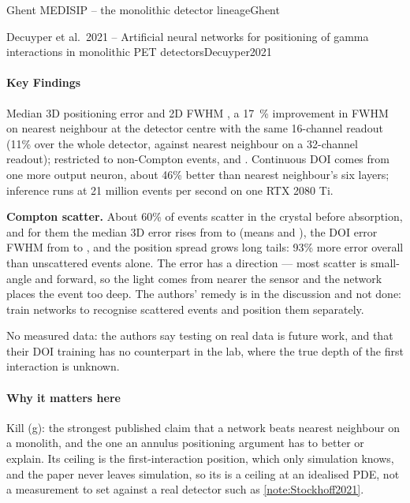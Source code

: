 \begin{programnote}{Ghent MEDISIP -- the monolithic detector lineage}{Ghent}
\begin{papernote}{Decuyper et al.\ 2021 -- Artificial neural networks for positioning of gamma interactions in monolithic PET detectors}{Decuyper2021}
\paragraph{Key Findings}
Median 3D positioning error  and 2D FWHM , a
\qty{17}{\percent} improvement in FWHM on nearest neighbour at the detector
centre with the same 16-channel readout (11\% over the whole detector, against
nearest neighbour on a 32-channel readout); restricted to
non-Compton events,  and . Continuous DOI comes from one
more output neuron, about 46\% better than nearest neighbour's six layers;
inference runs at 21 million events per second on one RTX 2080 Ti.

\textbf{Compton scatter.} About 60\% of
events scatter in the crystal before absorption, and for them the median 3D
error rises from  to  (means  and ),
the DOI error FWHM from  to , and the position spread
grows long tails: 93\% more error overall than unscattered events alone. The
error has a direction --- most scatter is small-angle and forward, so the
light comes from nearer the sensor and the network places the event too
deep. The authors' remedy is in the discussion and not done: train networks to
recognise scattered events and position them separately.

No measured data: the authors say testing on real data is future work, and
that their DOI training has no counterpart in the lab, where the true depth of
the first interaction is unknown.

\paragraph{Why it matters here}
Kill (g): the strongest published claim that a network beats nearest
neighbour on a monolith, and the one an annulus positioning argument has to
better or explain. Its ceiling is the first-interaction position, which only
simulation knows, and the paper never leaves simulation, so its  is
a ceiling at an idealised PDE, not a measurement to set against a real
detector such as \ref{note:Stockhoff2021}.


\end{papernote}
\end{programnote}
